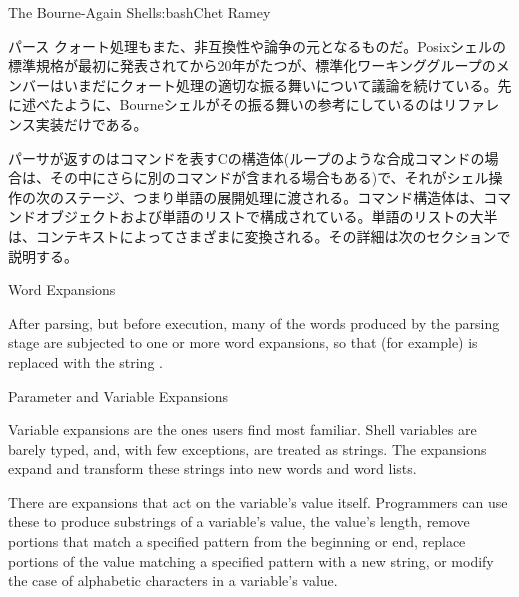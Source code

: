 \begin{aosachapter}{The Bourne-Again Shell}{s:bash}{Chet Ramey}
\begin{aosasect1}{パース}
クォート処理もまた、非互換性や論争の元となるものだ。Posixシェルの標準規格が最初に発表されてから20年がたつが、標準化ワーキンググループのメンバーはいまだにクォート処理の適切な振る舞いについて議論を続けている。先に述べたように、Bourneシェルがその振る舞いの参考にしているのはリファレンス実装だけである。

パーサが返すのはコマンドを表すCの構造体(ループのような合成コマンドの場合は、その中にさらに別のコマンドが含まれる場合もある)で、それがシェル操作の次のステージ、つまり単語の展開処理に渡される。コマンド構造体は、コマンドオブジェクトおよび単語のリストで構成されている。単語のリストの大半は、コンテキストによってさまざまに変換される。その詳細は次のセクションで説明する。

\end{aosasect1}

\begin{aosasect1}{Word Expansions}

After parsing, but before execution, many of the words produced by the
parsing stage are subjected to one or more word expansions, so that
(for example)  is replaced with the string
.

\begin{aosasect2}{Parameter and Variable Expansions}

Variable expansions are the ones users find most familiar.  Shell
variables are barely typed, and, with few exceptions, are treated as
strings.  The expansions expand and transform these strings into new
words and word lists.

There are expansions that act on the variable's value itself.
Programmers can use these to produce substrings of a variable's
value, the value's length, remove portions that match a specified
pattern from the beginning or end, replace portions of the value
matching a specified pattern with a new string, or modify the case of
alphabetic characters in a variable's value.


\end{aosasect2}
\end{aosasect1}
\end{aosachapter}
